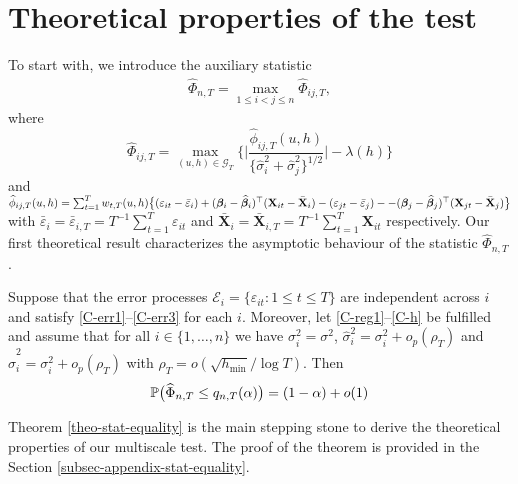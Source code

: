 \documentclass[a4paper,12pt]{article}
\newcommand{\doublehattwo}[1]{\widehat{\widehat{#1}}}
\begin{document}
\section{Theoretical properties of the test}\label{sec:theo}


To start with, we introduce the auxiliary statistic 
\begin{align}\label{Phi-hat-statistic}
\widehat{\Phi}_{n,T} = \max_{1 \le i < j \le n} \widehat{\Phi}_{ij,T},
\end{align}
where
\[ \widehat{\Phi}_{ij,T} = \max_{(u,h) \in \mathcal{G}_T} \Big\{ \Big| \frac{\widehat{\phi}_{ij,T}(u,h)} {\{ \widehat{\sigma}_i^2 + \widehat{\sigma}_j^2 \}^{1/2}} \Big| - \lambda(h) \Big \} \]
and $\widehat{\phi}_{ij,T}(u,h) = \sum_{t=1}^T w_{t,T}(u,h) \big\{ (\varepsilon_{it} - \bar{\varepsilon}_i) + (\bm{\beta}_i - \widehat{\bm{\beta}}_i)^\top (\mathbf{X}_{it} - \bar{\mathbf{X}}_{i}) - (\varepsilon_{jt} - \bar{\varepsilon}_j) - \linebreak - (\bm{\beta}_j - \widehat{\bm{\beta}}_j)^\top (\mathbf{X}_{jt} - \bar{\mathbf{X}}_{j}) \big\}$ with $\bar{\varepsilon}_i = \bar{\varepsilon}_{i,T} = T^{-1} \sum_{t=1}^T \varepsilon_{it}$ and $ \bar{\mathbf{X}}_{i} =  \bar{\mathbf{X}}_{i, T} = T^{-1}\sum_{t=1}^T  \mathbf{X}_{it}$ respectively. Our first theoretical result characterizes the asymptotic behaviour of the statistic $\widehat{\Phi}_{n,T}$. 
\begin{theorem}\label{theo-stat-equality}
Suppose that the error processes $\mathcal{E}_i = \{ \varepsilon_{it}: 1 \le t \le T \}$ are independent across $i$ and satisfy \ref{C-err1}--\ref{C-err3} for each $i$. Moreover, let \ref{C-reg1}--\ref{C-h} be fulfilled and assume that for all $i \in \{1, \ldots, n\}$ we have $\sigma_i^2 = \sigma^2$, $\widehat{\sigma}_i^2 = \sigma^2_i + o_p(\rho_T)$ and $\doublehattwo{\sigma}_i^2 = \sigma^2_i + o_p(\rho_T)$ with $\rho_T = o(\sqrt{h_{\min}}/\log T)$. Then 
\[ \mathbb{P} \big( \widehat{\Phi}_{n,T} \le q_{n,T}(\alpha) \big) = (1 - \alpha) + o(1) \]
\end{theorem}
Theorem \ref{theo-stat-equality} is the main stepping stone to derive the theoretical properties of our multiscale test. The proof of the theorem is provided in the Section \ref{subsec-appendix-stat-equality}.
\end{document}
